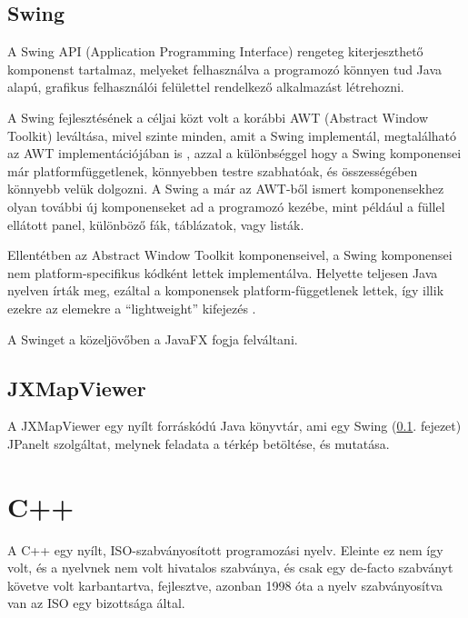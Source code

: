 \documentclass[a4paper,12pt]{report}
\begin{document}
\subsection{Swing}
\label{swing}

A Swing API (Application Programming Interface) rengeteg kiterjeszthető komponenst tartalmaz, melyeket felhasználva a programozó könnyen tud Java alapú, grafikus felhasználói felülettel rendelkező alkalmazást létrehozni. 

\vspace{2mm}
A Swing fejlesztésének a céljai közt volt a korábbi AWT (Abstract Window Toolkit) leváltása, mivel szinte minden, amit a Swing implementál, megtalálható az AWT implementációjában is \cite{awt}, azzal a különbséggel hogy a Swing komponensei már platformfüggetlenek, könnyebben testre szabhatóak, és összességében könnyebb velük dolgozni. A Swing a már az AWT-ből ismert komponensekhez olyan további új komponenseket ad a programozó kezébe, mint például a füllel ellátott panel, különböző fák, táblázatok, vagy listák.

\vspace{2mm}
Ellentétben az Abstract Window Toolkit komponenseivel, a Swing komponensei nem platform-specifikus kódként lettek implementálva. Helyette teljesen Java nyelven írták meg, ezáltal a komponensek platform-függetlenek lettek, így illik ezekre az elemekre a ``lightweight'' kifejezés \cite{swingarticle}.

\vspace{2mm}
A Swinget a közeljövőben a JavaFX \cite{javafx} fogja felváltani.

\subsection{JXMapViewer}
\label{jxmapviewer}

A JXMapViewer \cite{jxmapv} egy nyílt forráskódú Java könyvtár, ami egy Swing (\ref{swing}. fejezet) JPanelt \cite{jpanel} szolgáltat, melynek feladata a térkép betöltése, és mutatása.

\newpage
\section{C++}
\label{cplusplus}

A C++ egy nyílt, ISO-szabványosított programozási nyelv. Eleinte ez nem így volt, és a nyelvnek nem volt hivatalos szabványa, és csak egy de-facto szabványt követve volt karbantartva, fejlesztve, azonban 1998 óta \cite{c++98} a nyelv szabványosítva van az ISO egy bizottsága által.
\end{document}
